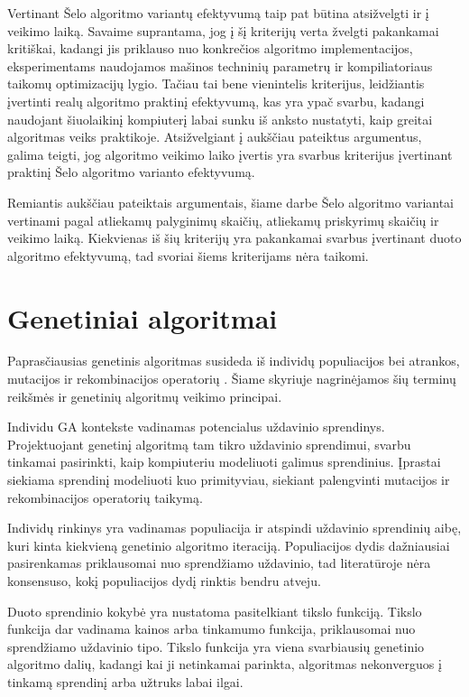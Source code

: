 \documentclass{VUMIFInfBakalaurinis}
\begin{document}
Vertinant Šelo algoritmo variantų efektyvumą taip pat būtina atsižvelgti ir į veikimo laiką.
Savaime suprantama, jog į šį kriterijų verta žvelgti pakankamai kritiškai, kadangi jis priklauso nuo konkrečios algoritmo implementacijos,
eksperimentams naudojamos mašinos techninių parametrų ir kompiliatoriaus taikomų optimizacijų lygio.
Tačiau tai bene vienintelis kriterijus, leidžiantis įvertinti realų algoritmo praktinį efektyvumą, kas yra ypač svarbu,
kadangi naudojant šiuolaikinį kompiuterį labai sunku iš anksto nustatyti, kaip greitai algoritmas veiks praktikoje.
Atsižvelgiant į aukščiau pateiktus argumentus, galima teigti, jog
algoritmo veikimo laiko įvertis yra svarbus kriterijus įvertinant praktinį Šelo algoritmo varianto efektyvumą.

Remiantis aukščiau pateiktais argumentais, šiame darbe Šelo algoritmo variantai vertinami pagal
atliekamų palyginimų skaičių, atliekamų priskyrimų skaičių ir veikimo laiką.
Kiekvienas iš šių kriterijų yra pakankamai svarbus įvertinant duoto algoritmo efektyvumą, tad svoriai šiems kriterijams nėra taikomi.

\section{Genetiniai algoritmai}

Paprasčiausias genetinis algoritmas susideda iš individų populiacijos bei atrankos, mutacijos ir rekombinacijos operatorių \cite{simpson1999faster}.
Šiame skyriuje nagrinėjamos šių terminų reikšmės ir genetinių algoritmų veikimo principai.

Individu GA kontekste vadinamas potencialus uždavinio sprendinys.
Projektuojant genetinį algoritmą tam tikro uždavinio sprendimui, svarbu tinkamai pasirinkti,
kaip kompiuteriu modeliuoti galimus sprendinius.
Įprastai siekiama sprendinį modeliuoti kuo primityviau, siekiant
palengvinti mutacijos ir rekombinacijos operatorių taikymą.

Individų rinkinys yra vadinamas populiacija ir atspindi uždavinio sprendinių aibę, kuri kinta kiekvieną genetinio algoritmo iteraciją.
Populiacijos dydis dažniausiai pasirenkamas priklausomai nuo sprendžiamo uždavinio,
tad literatūroje nėra konsensuso, kokį populiacijos dydį rinktis bendru atveju.

Duoto sprendinio kokybė yra nustatoma pasitelkiant tikslo funkciją.
Tikslo funkcija dar vadinama kainos arba tinkamumo funkcija, priklausomai nuo sprendžiamo uždavinio tipo.
Tikslo funkcija yra viena svarbiausių genetinio algoritmo dalių,
kadangi kai ji netinkamai parinkta, algoritmas nekonverguos į tinkamą sprendinį arba užtruks labai ilgai.
\end{document}
